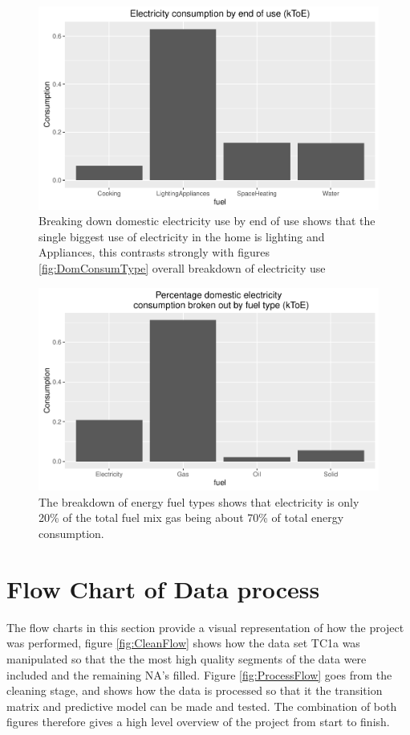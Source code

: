 \begin{figure}
    \centering
    \includegraphics[width =\textwidth]{Figures/Appendix/DomElConsumType}
    \caption[Domestic electricity consumption by end of use]{Breaking down domestic electricity use by end of use shows that the single biggest use of electricity in the home is lighting and Appliances, this contrasts strongly with figures \ref{fig:DomConsumType} overall breakdown of electricity use}
    \label{fig:DomElConsumType}
\end{figure}

\begin{figure}
    \centering
    \includegraphics[width =\textwidth]{Figures/Appendix/DomElConsumFuel}
    \caption[Energy consumption by fuel type]{The breakdown of energy fuel types shows that electricity is only 20\% of the total fuel mix gas being about 70\% of total energy consumption.}
    \label{fig:DomElConsumFuel}
\end{figure}

\iffalse
\chapter{Flow Chart of Data process}
The flow charts in this section provide a visual representation of how the project was performed, figure \ref{fig:CleanFlow} shows how the data set TC1a was manipulated so that the the most high quality segments of the data were included and the remaining NA's filled. Figure \ref{fig:ProcessFlow} goes from the cleaning stage, and shows how the data is processed so that it the transition matrix and predictive model can be made and tested. The combination of both figures therefore gives a high level overview of the project from start to finish.

